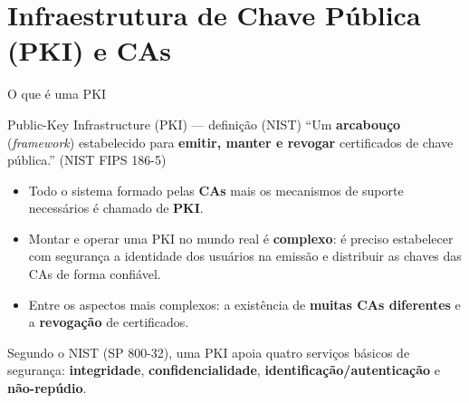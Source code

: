 \documentclass{beamer}
\begin{document}
\section{Infraestrutura de Chave Pública (PKI) e CAs}

\begin{frame}{O que é uma PKI}
    \begin{block}{Public-Key Infrastructure (PKI) --- definição (NIST)}
        \footnotesize
        ``Um \textbf{arcabouço} (\textit{framework}) estabelecido para \textbf{emitir, manter e revogar} certificados de chave pública.'' \hfill {\tiny (NIST FIPS 186-5)}
    \end{block}
    \medskip
    \begin{itemize}
        \footnotesize
        \item Todo o sistema formado pelas \textbf{CAs} mais os mecanismos de suporte necessários é chamado de \textbf{PKI}.
        \item Montar e operar uma PKI no mundo real é \textbf{complexo}: é preciso estabelecer com segurança a identidade dos usuários na emissão e distribuir as chaves das CAs de forma confiável.
        \item Entre os aspectos mais complexos: a existência de \textbf{muitas CAs diferentes} e a \textbf{revogação} de certificados.
    \end{itemize}
    \medskip
    \begin{tcolorbox}[colback=blue!5,colframe=blue!50!black,boxrule=0.5pt]
        \footnotesize
        Segundo o NIST (SP 800-32), uma PKI apoia quatro serviços básicos de segurança: \textbf{integridade}, \textbf{confidencialidade}, \textbf{identificação/autenticação} e \textbf{não-repúdio}.
    \end{tcolorbox}
\end{frame}
\end{document}

